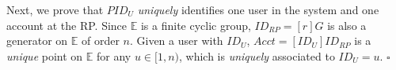 Next, we prove that $PID_{U}$ \emph{uniquely} identifies one user in the system and one account at the RP. Since $\mathbb{E}$ is a finite cyclic group, $ID_{RP} = [r]G$ is also a generator on $\mathbb{E}$ of order $n$. Given a user with $ID_U$, $Acct = [ID_U]ID_{RP}$ is a \emph{unique} point on $\mathbb{E}$ for any $u \in [1, n)$, which is \emph{uniquely} associated to $ID_U=u$. \hfill $\square$







